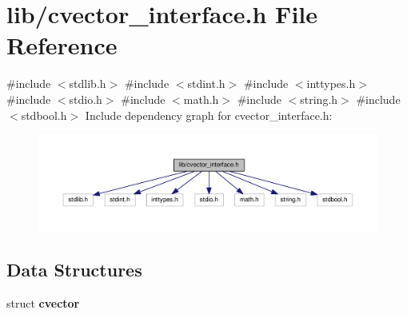 \section{lib/cvector\+\_\+interface.h File Reference}
\label{cvector__interface_8h}
{\ttfamily \#include $<$stdlib.\+h$>$}\newline
{\ttfamily \#include $<$stdint.\+h$>$}\newline
{\ttfamily \#include $<$inttypes.\+h$>$}\newline
{\ttfamily \#include $<$stdio.\+h$>$}\newline
{\ttfamily \#include $<$math.\+h$>$}\newline
{\ttfamily \#include $<$string.\+h$>$}\newline
{\ttfamily \#include $<$stdbool.\+h$>$}\newline
Include dependency graph for cvector\+\_\+interface.\+h\+:
\nopagebreak
\begin{figure}[H]
\begin{center}
\leavevmode
\includegraphics[width=350pt]{cvector__interface_8h__incl}
\end{center}
\end{figure}
\subsection*{Data Structures}
\begin{DoxyCompactItemize}
\item 
struct \textbf{ cvector}
\end{DoxyCompactItemize}

